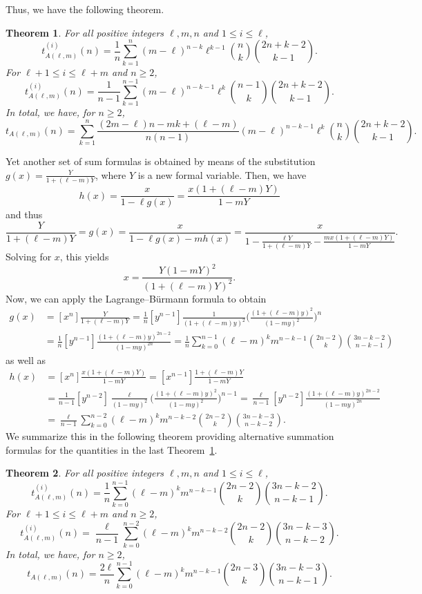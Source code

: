 \documentclass[12pt]{amsart}
\newtheorem{theorem}{Theorem}
\begin{document}
Thus, we have the following theorem.

\begin{theorem}\label{thm:removesquare-alternative}
For all positive integers $\ell,m,n$ and $1 \leq i \leq \ell$,
    $$t_{A(\ell,m)}^{(i)}(n) = \frac{1}{n} \sum_{k=1}^{n} (m-\ell)^{n-k} \ell^{k-1} \binom{n}{k} \binom{2n+k-2}{k-1}.$$
For $\ell + 1 \leq i \leq \ell+m$ and $n \geq 2$,
    $$t_{A(\ell,m)}^{(i)}(n) = \frac{1}{n-1} \sum_{k=1}^{n-1} (m-\ell)^{n-k-1} \ell^k \binom{n-1}{k} \binom{2n+k-2}{k-1}.$$
In total, we have, for $n \geq 2$,
    $$t_{A(\ell,m)}(n) = \sum_{k=1}^{n} \frac{(2m-\ell)n - m k + (\ell-m)}{n(n-1)}  (m-\ell)^{n-k-1} \ell^k \binom{n}{k} \binom{2n+k-2}{k-1}.$$
\end{theorem}

Yet another set of sum formulas is obtained by means of the substitution $g(x) = \frac{Y}{1+(\ell-m)Y}$, where $Y$ is a new formal variable. Then, we have
$$h(x) = \frac{x}{1-\ell g(x)} = \frac{x(1+(\ell-m)Y)}{1-mY}$$
and thus
$$\frac{Y}{1+(\ell-m)Y} = g(x) = \frac{x}{1-\ell g(x) - m h(x)} = \frac{x}{1- \frac{\ell Y}{1+(\ell-m)Y}
- \frac{m x(1+(\ell-m)Y)}{1-m Y}}.$$
Solving for $x$, this yields
$$x = \frac{Y(1-mY)^2}{(1+(\ell-m)Y)^2}.$$
Now, we can apply the Lagrange--B\"urmann formula to obtain
\begin{align*}
[x^n] g(x) &= [x^n] \frac{Y}{1+(\ell-m)Y} 
= \frac{1}{n} [y^{n-1}] \frac{1}{(1+(\ell-m)y)^2} \Big( \frac{(1+(\ell-m)y)^2}{(1-my)^2} \Big)^n \\
&= \frac{1}{n} [y^{n-1}] \frac{(1+(\ell-m)y)^{2n-2}}{(1-my)^{2n}}
= \frac{1}{n} \sum_{k=0}^{n-1} (\ell-m)^k m^{n-k-1} \binom{2n-2}{k} \binom{3n-k-2}{n-k-1}
\end{align*}
as well as
\begin{align*}
[x^n] h(x) &= [x^n] \frac{x (1+(\ell-m)Y)}{1-mY} = [x^{n-1}] \frac{1+(\ell-m)Y}{1-mY} \\
&= \frac{1}{n-1} [y^{n-2}] \frac{\ell}{(1-my)^2} \Big( \frac{(1+(\ell-m)y)^2}{(1-my)^2} \Big)^{n-1} = \frac{\ell}{n-1} [y^{n-2}]
\frac{(1+(\ell-m)y)^{2n-2}}{(1-my)^{2n}} \\
&= \frac{\ell}{n-1} \sum_{k=0}^{n-2} (\ell-m)^k m^{n-k-2} \binom{2n-2}{k} \binom{3n-k-3}{n-k-2}.
\end{align*}
We summarize this in the following theorem providing alternative summation formulas for the quantities in the last Theorem~\ref{thm:removesquare-alternative}.

\begin{theorem}\label{thm:removesquare-alternative2}
For all positive integers $\ell,m,n$ and $1 \leq i \leq \ell$,
    $$t_{A(\ell,m)}^{(i)}(n) = \frac{1}{n} \sum_{k=0}^{n-1} (\ell-m)^k m^{n-k-1} \binom{2n-2}{k} \binom{3n-k-2}{n-k-1}.$$
For $\ell + 1 \leq i \leq \ell+m$ and $n \geq 2$,
    $$t_{A(\ell,m)}^{(i)}(n) = \frac{\ell}{n-1} \sum_{k=0}^{n-2} (\ell-m)^k m^{n-k-2} \binom{2n-2}{k} \binom{3n-k-3}{n-k-2}.$$
In total, we have, for $n \geq 2$,
    $$t_{A(\ell,m)}(n) = \frac{2\ell}{n} \sum_{k=0}^{n-1} (\ell-m)^k m^{n-k-1} \binom{2n-3}{k} \binom{3n-k-3}{n-k-1}.$$
\end{theorem}
\end{document}
